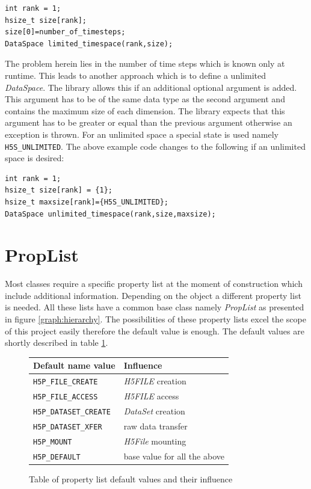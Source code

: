 \begin{lstlisting}
int rank = 1;
hsize_t size[rank];
size[0]=number_of_timesteps;
DataSpace limited_timespace(rank,size);
\end{lstlisting}
The problem herein lies in the number of time steps which is known only at runtime. This leads to another approach which is to define a unlimited \textit{DataSpace}. The library allows this if an additional optional argument is added. This argument has to be of the same data type as the second argument and contains the maximum size of each dimension. The library expects that this argument has to be greater or equal than the previous argument otherwise an exception is thrown. For an unlimited space a special state is used namely \texttt{H5S\_UNLIMITED}. The above example code changes to the following if an unlimited space is desired:
\begin{lstlisting}
int rank = 1;
hsize_t size[rank] = {1};
hsize_t maxsize[rank]={H5S_UNLIMITED};
DataSpace unlimited_timespace(rank,size,maxsize);
\end{lstlisting}

\section{PropList}
Most classes require a specific property list at the moment of construction which include additional information. Depending on the object a different property list is needed. All these lists have a common base class namely \textit{PropList} as presented in figure \ref{graph:hierarchy}. The possibilities of these property lists excel the scope of this project easily therefore the default value is enough. The default values are shortly described in table \ref{table:default}.

\begin{figure}[ht!]
\centering
\begin{tabular}{|l|l|}
\hline
Default name value&Influence\\
\hline
\texttt{H5P\_FILE\_CREATE}&\textit{H5FILE} creation\\
\texttt{H5P\_FILE\_ACCESS}&\textit{H5FILE} access\\
\texttt{H5P\_DATASET\_CREATE}&\textit{DataSet} creation\\
\texttt{H5P\_DATASET\_XFER}&raw data transfer\\
\texttt{H5P\_MOUNT}&\textit{H5File} mounting\\
\texttt{H5P\_DEFAULT}&base value for all the above\\
\hline
\end{tabular}
\caption{Table of property list default values and their influence}
\label{table:default}
\end{figure}

